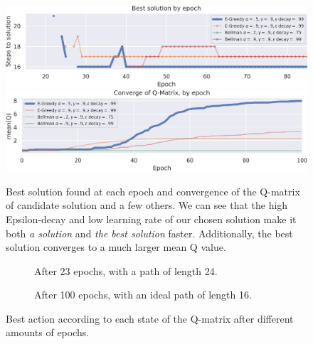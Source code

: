 \begin{figure}[H]
	\centering
	\includegraphics[width=\textwidth]{task1_best_solution_by_epoch.png} \\[1ex]
	\includegraphics[width=\textwidth]{task1_qmatrix_convergence.png}
	\caption{Best solution found at each epoch and convergence of the Q-matrix of candidate solution and a few others. We can see that the high Epsilon-decay and low learning rate of our chosen solution make it both \emph{a solution} and \emph{the best solution} faster. Additionally, the best solution converges to a much larger mean Q value.}
\end{figure}

\vspace{-13pt}

\renewcommand{\textuparrow}{\ensuremath{\upa{}}}
\renewcommand{\textdownarrow}{\ensuremath{\downa{}}}
\renewcommand{\textleftarrow}{\ensuremath{\lefta{}}}
\renewcommand{\textrightarrow}{\ensuremath{\righta{}}}
\begin{figure}[H]
	\centering
	\begin{subfigure}{.42\textwidth}
		\resizebox{\textwidth}{!}{}
		\caption{After 23 epochs, with a path of length 24.}
	\end{subfigure}
	\begin{subfigure}{.42\textwidth}
		\resizebox{\textwidth}{!}{}
		\caption{After 100 epochs, with an ideal path of length 16.}
	\end{subfigure}
	\caption{Best action according to each state of the Q-matrix after different amounts of epochs.}
\end{figure}
